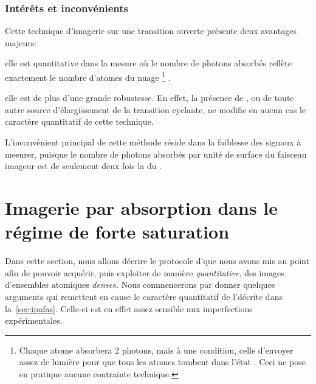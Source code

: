 \subsubsection{Intérêts et inconvénients}
\noindent
Cette technique d'imagerie sur une transition ouverte présente deux avantages majeurs:
\begin{itemizel}
	\item elle est quantitative dans la mesure où le nombre de photons absorbés reflète exactement le nombre d'atomes du nuage%
\footnote{Chaque atome absorbera 2 photons, mais à une condition, celle d'envoyer assez de lumière pour que tous les atomes tombent dans l'état . Ceci ne pose en pratique aucune contrainte technique.}%
.
	\item elle est de plus d'une grande robustesse. En effet, la présence de \gchm, ou de toute autre source d'élargissement de la transition cyclante, ne modifie en aucun cas le caractère quantitatif de cette technique. 
\end{itemizel}

\casse

\noindent
L'inconvénient principal de cette méthode réside dans la faiblesse des signaux à mesurer, puisque le nombre de photons absorbés par unité de surface du faisceau imageur est de seulement deux fois la \dcol du \n.


\section{Imagerie par absorption dans le régime de forte saturation}\label{sec:ipafos}
Dans cette section, nous allons décrire le protocole d'\ipa que nous avons mis au point afin de pouvoir acquérir, puis exploiter de manière \emph{quantitative}, des images d'ensembles atomiques \emph{denses.} 
Nous commencerons par donner quelques arguments qui remettent en cause le caractère quantitatif de l'\ipafas décrite dans la~\autoref{sec:ipafas}. Celle-ci est en effet assez sensible aux imperfections expérimentales.

